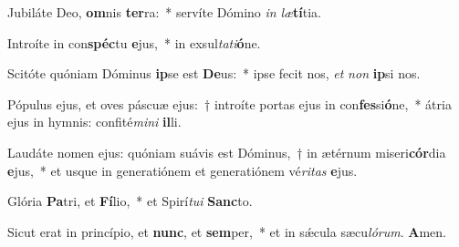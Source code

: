 \item Jubiláte Deo, \textbf{om}nis \textbf{ter}ra:~* servíte Dómino \textit{in} \textit{læ}\textbf{tí}tia.

\item Introíte in con\textbf{spéc}tu \textbf{e}jus,~* in exsul\textit{tati}\textbf{ó}ne.

\item Scitóte quóniam Dóminus \textbf{ip}se est \textbf{De}us:~* ipse fecit nos, \textit{et} \textit{non} \textbf{ip}si nos.

\item Pópulus ejus, et oves páscuæ ejus:~† introíte portas ejus in con\textbf{fes}si\textbf{ó}ne,~* átria ejus in hymnis: confité\textit{mini} \textbf{il}li.

\item Laudáte nomen ejus: quóniam suávis est Dóminus,~† in ætérnum miseri\textbf{cór}dia \textbf{e}jus,~* et usque in generatiónem et generatiónem vé\textit{ritas} \textbf{e}jus.

\item Glória \textbf{Pa}tri, et \textbf{Fí}lio,~* et Spirí\textit{tui} \textbf{Sanc}to.

\item Sicut erat in princípio, et \textbf{nunc}, et \textbf{sem}per,~* et in sǽcula sæcu\textit{lórum}. \textbf{A}men.

